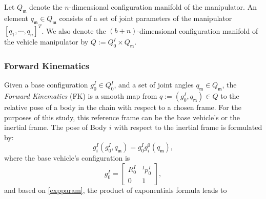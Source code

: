 \documentclass[lettersize,journal]{IEEEtran}
\theoremstyle{remark}
\begin{document}
Let $Q_\mathfrak{m}$ denote the $n$-dimensional configuration manifold of the manipulator. An element $q_\mathfrak{m} \in Q_\mathfrak{m}$ consists of a set of joint parameters of the manipulator $[q_1,\cdots,q_n]^T$. We also denote the $(b+n)$-dimensional configuration manifold of the vehicle manipulator by $Q:=Q^I_0 \times Q_\mathfrak{m}$. %
\subsubsection{Forward Kinematics}
\label{forwardkinematics}
Given a base configuration $g^I_0 \in Q_0^I$, and a set of joint angles $q_\mathfrak{m} \in Q_\mathfrak{m}$,  %
the \textit{Forward Kinematics} (FK) is a smooth map from $q:=(g^I_0 ,q_\mathfrak{m}) \in Q$ to the relative pose of a body in the chain with respect to a chosen frame. For the purposes of this study, this reference frame can be the base vehicle's or the inertial frame.
The pose of Body $i$ with respect to the inertial frame is formulated by:
\begin{equation}
    g^I_{i}(g^I_0, q_\mathfrak{m})=g^I_{0}g^0_{i}(q_\mathfrak{m}),
\end{equation}
where the base vehicle's configuration is
\begin{equation}
    g^I_0 =\begin{bmatrix}R^I_0 & ^Ip^I_0\\0&1\end{bmatrix},
\end{equation}
and based on \eqref{expparam}, the product of exponentials formula \cite{murray1994mathematical} leads to
\end{document}
